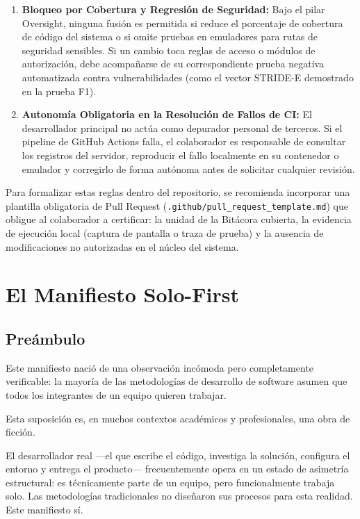\documentclass[14pt,a4paper,oneside]{extbook}
\begin{document}
\begin{enumerate}
    \item \textbf{Bloqueo por Cobertura y Regresión de Seguridad:} Bajo el pilar Oversight, ninguna fusión es permitida si reduce el porcentaje de cobertura de código del sistema o si omite pruebas en emuladores para rutas de seguridad sensibles. Si un cambio toca reglas de acceso o módulos de autorización, debe acompañarse de su correspondiente prueba negativa automatizada contra vulnerabilidades (como el vector STRIDE-E demostrado en la prueba F1).

    \item \textbf{Autonomía Obligatoria en la Resolución de Fallos de CI:} El desarrollador principal no actúa como depurador personal de terceros. Si el pipeline de GitHub Actions falla, el colaborador es responsable de consultar los registros del servidor, reproducir el fallo localmente en su contenedor o emulador y corregirlo de forma autónoma antes de solicitar cualquier revisión.
\end{enumerate}

Para formalizar estas reglas dentro del repositorio, se recomienda incorporar una plantilla obligatoria de Pull Request (\texttt{.github/pull\_request\_template.md}) que obligue al colaborador a certificar: la unidad de la Bitácora cubierta, la evidencia de ejecución local (captura de pantalla o traza de prueba) y la ausencia de modificaciones no autorizadas en el núcleo del sistema.


\chapter{El Manifiesto Solo-First}
\section{Preámbulo}

Este manifiesto nació de una observación incómoda pero completamente verificable: la mayoría de las metodologías de desarrollo de software asumen que todos los integrantes de un equipo quieren trabajar.

Esta suposición es, en muchos contextos académicos y profesionales, una obra de ficción.

El desarrollador real ---el que escribe el código, investiga la solución, configura el entorno y entrega el producto--- frecuentemente opera en un estado de asimetría estructural: es técnicamente parte de un equipo, pero funcionalmente trabaja solo. Las metodologías tradicionales no diseñaron sus procesos para esta realidad. Este manifiesto sí.
\end{document}

